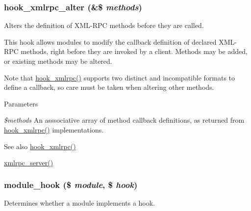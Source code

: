 \hypertarget{group__hooks_ga78ca7e3728a28b5d22152168b2b264cf}{
\subsubsection[{hook\_\-xmlrpc\_\-alter}]{\setlength{\rightskip}{0pt plus 5cm}hook\_\-xmlrpc\_\-alter (\&\$ {\em methods})}}
\label{group__hooks_ga78ca7e3728a28b5d22152168b2b264cf}
Alters the definition of XML-\/RPC methods before they are called.

This hook allows modules to modify the callback definition of declared XML-\/RPC methods, right before they are invoked by a client. Methods may be added, or existing methods may be altered.

Note that \hyperlink{group__hooks_ga9debe627e55ecff58ffaf71689dbec2e}{hook\_\-xmlrpc()} supports two distinct and incompatible formats to define a callback, so care must be taken when altering other methods.


\begin{DoxyParams}{Parameters}
\item[{\em \$methods}]An asssociative array of method callback definitions, as returned from \hyperlink{group__hooks_ga9debe627e55ecff58ffaf71689dbec2e}{hook\_\-xmlrpc()} implementations.\end{DoxyParams}
\begin{DoxySeeAlso}{See also}
\hyperlink{group__hooks_ga9debe627e55ecff58ffaf71689dbec2e}{hook\_\-xmlrpc()} 

\hyperlink{xmlrpcs_8inc_aff1b954dfb418c8c13f2432e15a86dab}{xmlrpc\_\-server()} 
\end{DoxySeeAlso}
\hypertarget{group__hooks_ga0d7a0b03039c561b63424b2a6cf6103f}{
\subsubsection[{module\_\-hook}]{\setlength{\rightskip}{0pt plus 5cm}module\_\-hook (\$ {\em module}, \/  \$ {\em hook})}}
\label{group__hooks_ga0d7a0b03039c561b63424b2a6cf6103f}
Determines whether a module implements a hook.


